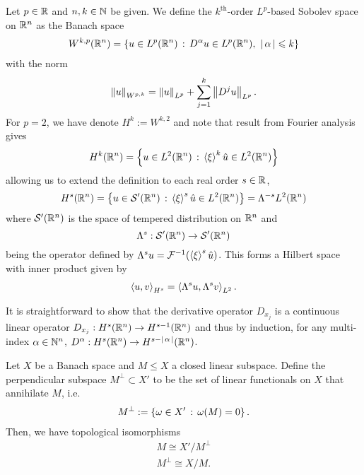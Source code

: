 \documentclass[12pt]{article}
\begin{document}
\begin{fdefinition} Let $p \in \R$ and $n, k \in \N$ be given. We define the $k^{\text{th}}$-order $L^p$-based Sobolev space on $\R^n$ as the Banach space
    \begin{align*}
    W^{k, p}(\R^n) = \set{u \in L^p(\R^n) \wh D^\alpha u \in L^p(\R^n), \, \, \abs{\alpha} \leq k }
    \end{align*}
    with the norm
    \begin{align*}
    \norm[u]_{W^{p, k}} = \norm[u]_{L^p} + \sum_{j = 1}^k \norm[D^j u]_{L^p}. 
    \end{align*}
    For $p = 2$, we have denote $H^k := W^{k ,2}$ and note that result from Fourier analysis gives
    \begin{align*}
    H^k(\R^n) = \set{u \in L^2(\R^n) \wh \abrac{\xi}^k \hat{u} \in L^2(\R^n)}
    \end{align*}
    allowing us to extend the definition to each real order $s \in \R$, 
    \begin{align*}
    H^s(\R^n) = \set{u \in \sch'(\R^n) \wh \abrac{\xi}^s \hat{u} \in L^2(\R^n)} = \Lambda^{-s} L^2(\R^n) 
    \end{align*}
    where $\sch'(\R^n)$ is the space of tempered distribution on $\R^n$ and 
    $$\Lambda^s: \sch'(\R^n) \to \sch'(\R^n)$$
     being the operator defined by $\Lambda^su = \F^{-1}(\abrac{\xi}^s \hat{u})$. This forms a Hilbert space with inner product given by
    \begin{align*}
    \inprod[u, v]_{H^s} = \inprod[ \Lambda^su, \Lambda^sv]_{L^2}. 
    \end{align*}
\end{fdefinition}
\begin{rem}
    It is straightforward to show that the derivative operator $D_{x_j}$ is a continuous linear operator $D_{x_j}: H^s(\R^n) \to H^{s - 1}(\R^n)$ and thus by induction, for any multi-index $\alpha \in \N^n$, $D^{\alpha} : H^s(\R^n) \to H^{s - \abs{\alpha}}(\R^n)$. 
\end{rem}

%


\begin{flemma}
    Let $X$ be a Banach space and $M \leq X$ a closed linear subspace. Define the perpendicular subspace $M^\perp \subset X'$ to be the set of linear functionals on $X$ that annihilate $M$, i.e. 
    \begin{align*}
    M^\perp := \set{\omega \in X' \wh \omega(M) = 0}. 
    \end{align*}
    Then, we have topological isomorphisms
    \begin{align*}
    M \cong X' / M^\perp \\
    M^\perp \cong X / M. 
    \end{align*}
\end{flemma}
\end{document}
